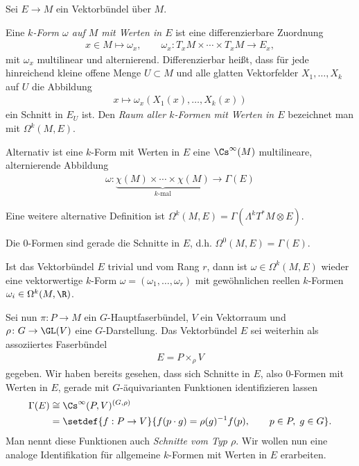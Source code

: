 \documentclass[%
	paper=a5,%
	fleqn,%
	DIV=18,%
	BCOR=0mm,
	fontsize=11pt,
	titlepage=false,%
	bibliography=totoc,
	DIV=18,%
	twoside=true,
	pdftitle=Riemannsche Geometrie,
	pdfauthor=Uwe Semmelmann,
	numbers=noendperiod]%
	{scrbook}
\begin{document}
Sei $E\to M$ ein Vektorbündel über $M$.

\begin{defn}
Eine \emph{$k$-Form $\omega$ auf $M$ mit Werten in $E$} ist eine
differenzierbare Zuordnung
\begin{align*}
x\in M\mapsto \omega_x,\qquad \omega_x : T_xM\times\cdots \times T_xM\to E_x,
\end{align*}
mit $\omega_x$ multilinear und alternierend. Differenzierbar heißt, dass für jede hinreichend kleine offene Menge
$U\subset M$ und alle glatten Vektorfelder $X_1,\ldots,X_k$ auf $U$ die
Abbildung
\begin{align*}
x\mapsto \omega_x(X_1(x),\ldots,X_k(x))
\end{align*}
ein Schnitt in $E_{U}$ ist. Den \emph{Raum aller $k$-Formen mit Werten in $E$}
bezeichnet man mit $\Omega^k(M,E)$.\fish
\end{defn}

\begin{rem}[Bemerkungen.]
\begin{remenum}
\item
Alternativ ist eine $k$-Form mit Werten in $E$ eine $\Cs^\infty(M)$
multilineare, alternierende Abbildung
\begin{align*}
\omega\colon \underbrace{\chi(M)\times \cdots \times \chi(M)}_{k\text{-mal}}\to
\Gamma(E)
\end{align*}
\item Eine weitere alternative Definition ist $\Omega^k(M,E)
=\Gamma(\Lambda^kT^*M\otimes E)$.
\item Die $0$-Formen sind gerade die Schnitte in $E$, d.h. $\Omega^0(M,E) =
\Gamma(E)$.
\item Ist das Vektorbündel $E$ trivial und vom Rang $r$, dann ist
$\omega\in\Omega^k(M,E)$ wieder eine vektorwertige $k$-Form $\omega =
(\omega_1,\ldots,\omega_r)$ mit gewöhnlichen reellen $k$-Formen
$\omega_i\in\Omega^k(M,\R)$.\map
\end{remenum}
\end{rem}

Sei nun $\pi\colon P\to M$ ein $G$-Hauptfaserbündel, $V$ ein Vektorraum und $\rho\colon
G\to \GL(V)$ eine $G$-Darstellung. Das Vektorbündel $E$ sei weiterhin als
assoziiertes Faserbündel
\begin{align*}
E = P\times_\rho V
\end{align*}
gegeben. Wir haben bereits gesehen, dass sich Schnitte in $E$, also $0$-Formen
mit Werten in $E$, gerade mit $G$-äquivarianten Funktionen identifizieren lassen
\begin{align*}
\Gamma(E) &\cong \Cs^\infty(P,V)^{(G,\rho)}\\
&= \setdef{f: P\to V}{f(p\cdot g) = \rho(g)^{-1}f(p),\qquad p\in P,\; g\in G}.
\end{align*}
Man nennt diese Funktionen auch \emph{Schnitte vom Typ $\rho$}.
Wir wollen nun eine analoge Identifikation für allgemeine $k$-Formen mit Werten
in $E$ erarbeiten.
\end{document}
